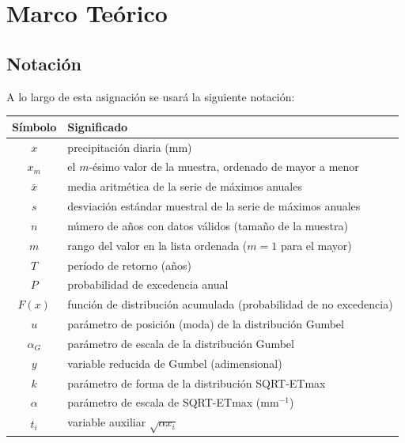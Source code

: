 \documentclass[11pt]{article}
\begin{document}
\section*{Marco Teórico}

\subsection*{Notación}

A lo largo de esta asignación se usará la siguiente notación:

\begin{center}
\begin{tabular}{cl}
\toprule
\textbf{Símbolo} & \textbf{Significado} \\
\midrule
$x$              & precipitación diaria (mm) \\
$x_m$            & el $m$-ésimo valor de la muestra, ordenado de mayor a menor \\
$\bar{x}$        & media aritmética de la serie de máximos anuales \\
$s$              & desviación estándar muestral de la serie de máximos anuales \\
$n$              & número de años con datos válidos (tamaño de la muestra) \\
$m$              & rango del valor en la lista ordenada ($m=1$ para el mayor) \\
$T$              & período de retorno (años) \\
$P$              & probabilidad de excedencia anual \\
$F(x)$           & función de distribución acumulada (probabilidad de no excedencia) \\
$u$              & parámetro de posición (moda) de la distribución Gumbel \\
$\alpha_G$       & parámetro de escala de la distribución Gumbel \\
$y$              & variable reducida de Gumbel (adimensional) \\
$k$              & parámetro de forma de la distribución SQRT-ETmax \\
$\alpha$         & parámetro de escala de SQRT-ETmax ($\mathrm{mm}^{-1}$) \\
$t_i$            & variable auxiliar $\sqrt{\alpha x_i}$ \\
\bottomrule
\end{tabular}
\end{center}
\end{document}

